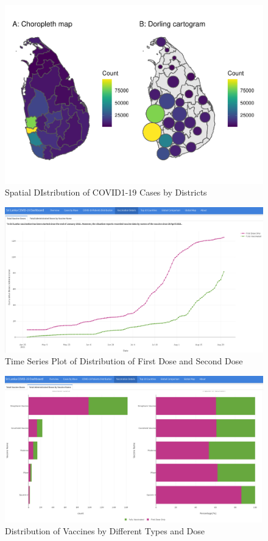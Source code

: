 \documentclass[
]{article}
\begin{document}
\begin{figure}
\centering
\includegraphics{manuscript_covid19dashboard_files/figure-latex/unnamed-chunk-5-1.pdf}
\caption{Spatial DIstribution of COVID1-19 Cases by Districts}
\end{figure}

\begin{figure}

{\centering \includegraphics[width=0.8\linewidth]{Images/d3} 

}

\caption{Time Series Plot of Distribution of First Dose and Second Dose}\label{fig:unnamed-chunk-6}
\end{figure}

\begin{figure}

{\centering \includegraphics[width=0.8\linewidth]{Images/d2} 

}

\caption{Distribution of Vaccines by Different Types and Dose}\label{fig:unnamed-chunk-7}
\end{figure}
\end{document}
